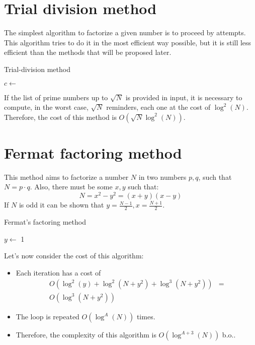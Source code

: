 \section{Trial division method}
The simplest algorithm to factorize a given number is to proceed by attempts. \newline
This algorithm tries to do it in the most efficient way possible, but it is still less efficient than the methods that will be proposed later.
\begin{algorithm}
\caption{Trial-division method}\label{alg:trial_division_method}
$c \gets$ \;
\;
\end{algorithm}
If the list of prime numbers up to $\sqrt{N}$ is provided in input, it is necessary to compute, in the worst case, $\sqrt{N}$ reminders, each one at the cost of $\operatorname{log}^{2}(N)$. \newline
Therefore, the cost of this method is $O(\sqrt{N} \operatorname{log}^{2}(N))$.

\section{Fermat factoring method}
This method aims to factorize a number $N$ in two numbers $p, q$, such that $N = p \cdot q$. Also, there must be some $x,y$ such that:
\[
N = x^{2} - y^{2} = (x + y)(x - y)
\]
If $N$ is odd it can be shown that $y = \frac{N - 1}{2}, x = \frac{N + 1}{2}$.
\begin{algorithm}
\caption{Fermat's factoring method}\label{alg:fermat_factoring_method}
$y \gets$ 1\;
\end{algorithm}
Let's now consider the cost of this algorithm:
\begin{itemize}
    \item Each iteration has a cost of
    \begin{align*}
        O(\operatorname{log}^{2}(y) + \operatorname{log}^{2}(N + y^{2}) + \operatorname{log}^{3}(N + y^{2})) & = \\
        O(\operatorname{log}^{3}(N + y^{2}))
    \end{align*}
    \item The loop is repeated $O(\operatorname{log}^{A}(N))$ times.
    \item Therefore, the complexity of this algorithm is $O(\operatorname{log}^{A + 3}(N))$ b.o..
\end{itemize}

